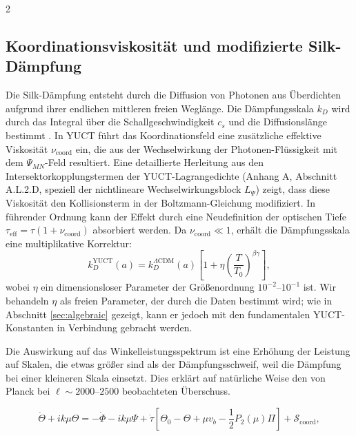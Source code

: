 \documentclass[11pt,a4paper]{article}
\begin{document}
\begin{multicols}{2}
		\subsection{Koordinationsviskosität und modifizierte Silk-Dämpfung}
		
		Die Silk-Dämpfung entsteht durch die Diffusion von Photonen aus Überdichten aufgrund ihrer endlichen mittleren freien Weglänge. Die Dämpfungsskala $k_D$ wird durch das Integral über die Schallgeschwindigkeit $c_s$ und die Diffusionslänge bestimmt \cite{Silk1968}. In YUCT führt das Koordinationsfeld eine zusätzliche effektive Viskosität $\nu_{\mathrm{coord}}$ ein, die aus der Wechselwirkung der Photonen-Flüssigkeit mit dem $\Psi_{MN}$-Feld resultiert. Eine detaillierte Herleitung aus den Intersektorkopplungstermen der YUCT-Lagrangedichte (Anhang A, Abschnitt A.L.2.D, speziell der nichtlineare Wechselwirkungsblock $L_{\Psi}$) zeigt, dass diese Viskosität den Kollisionsterm in der Boltzmann-Gleichung modifiziert. In führender Ordnung kann der Effekt durch eine Neudefinition der optischen Tiefe $\tau_{\mathrm{eff}} = \tau (1 + \nu_{\mathrm{coord}})$ absorbiert werden. Da $\nu_{\mathrm{coord}} \ll 1$, erhält die Dämpfungsskala eine multiplikative Korrektur:
		\begin{equation}
			k_D^{\text{YUCT}}(a) = k_D^{\Lambda\text{CDM}}(a) \left[1 + \eta \left(\frac{T}{T_0}\right)^{\beta\gamma}\right],
			\label{eq:kD}
		\end{equation}
		wobei $\eta$ ein dimensionsloser Parameter der Größenordnung $10^{-2}$--$10^{-1}$ ist. Wir behandeln $\eta$ als freien Parameter, der durch die Daten bestimmt wird; wie in Abschnitt \ref{sec:algebraic} gezeigt, kann er jedoch mit den fundamentalen YUCT-Konstanten in Verbindung gebracht werden.
		
		Die Auswirkung auf das Winkelleistungsspektrum ist eine Erhöhung der Leistung auf Skalen, die etwas größer sind als der Dämpfungsschweif, weil die Dämpfung bei einer kleineren Skala einsetzt. Dies erklärt auf natürliche Weise den von Planck bei $\ell \sim 2000$--$2500$ beobachteten Überschuss.
		
	\end{multicols}
	
	\begin{equation}
		\dot{\Theta} + ik\mu\Theta = -\dot{\Phi} - ik\mu\Psi + \dot{\tau}\left[\Theta_0 - \Theta + \mu v_b - \frac{1}{2}P_2(\mu)\Pi\right] + \mathcal{S}_{\mathrm{coord}},
		\label{eq:boltzmann}
	\end{equation}
	
\end{document}
